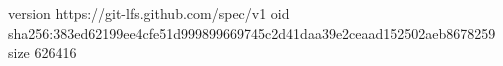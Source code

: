 version https://git-lfs.github.com/spec/v1
oid sha256:383ed62199ee4cfe51d999899669745c2d41daa39e2ceaad152502aeb8678259
size 626416
